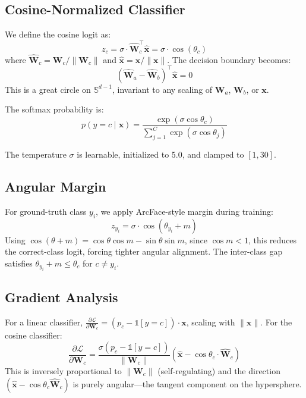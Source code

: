 \documentclass[conference]{IEEEtran}
\begin{document}
\subsection{Cosine-Normalized Classifier}
We define the cosine logit as:
\begin{equation}
z_c = \sigma \cdot \hat{\mathbf{W}}_c^\top \hat{\mathbf{x}} = \sigma \cdot \cos(\theta_c)
\end{equation}
where $\hat{\mathbf{W}}_c = \mathbf{W}_c/\|\mathbf{W}_c\|$ and $\hat{\mathbf{x}} = \mathbf{x}/\|\mathbf{x}\|$. The decision boundary becomes:
\begin{equation}
(\hat{\mathbf{W}}_a - \hat{\mathbf{W}}_b)^\top \hat{\mathbf{x}} = 0
\end{equation}
This is a great circle on $\mathbb{S}^{d-1}$, invariant to any scaling of $\mathbf{W}_a$, $\mathbf{W}_b$, or $\mathbf{x}$.

The softmax probability is:
\begin{equation}
p(y{=}c \mid \mathbf{x}) = \frac{\exp(\sigma\cos\theta_c)}{\sum_{j=1}^{C}\exp(\sigma\cos\theta_j)}
\end{equation}

The temperature $\sigma$ is learnable, initialized to 5.0, and clamped to $[1, 30]$.

\subsection{Angular Margin}
For ground-truth class $y_i$, we apply ArcFace-style margin during training:
\begin{equation}
z_{y_i} = \sigma \cdot \cos(\theta_{y_i} + m)
\end{equation}
Using $\cos(\theta+m) = \cos\theta\cos m - \sin\theta\sin m$, since $\cos m < 1$, this reduces the correct-class logit, forcing tighter angular alignment. The inter-class gap satisfies $\theta_{y_i} + m \leq \theta_c$ for $c \neq y_i$.

\subsection{Gradient Analysis}
For a linear classifier, $\frac{\partial\mathcal{L}}{\partial\mathbf{W}_c} = (p_c - \mathbb{1}[y{=}c])\cdot\mathbf{x}$, scaling with $\|\mathbf{x}\|$. For the cosine classifier:
\begin{equation}
\frac{\partial\mathcal{L}}{\partial\mathbf{W}_c} = \frac{\sigma(p_c - \mathbb{1}[y{=}c])}{\|\mathbf{W}_c\|}\left(\hat{\mathbf{x}} - \cos\theta_c\cdot\hat{\mathbf{W}}_c\right)
\end{equation}
This is inversely proportional to $\|\mathbf{W}_c\|$ (self-regulating) and the direction $(\hat{\mathbf{x}} - \cos\theta_c\hat{\mathbf{W}}_c)$ is purely angular---the tangent component on the hypersphere.
\end{document}
